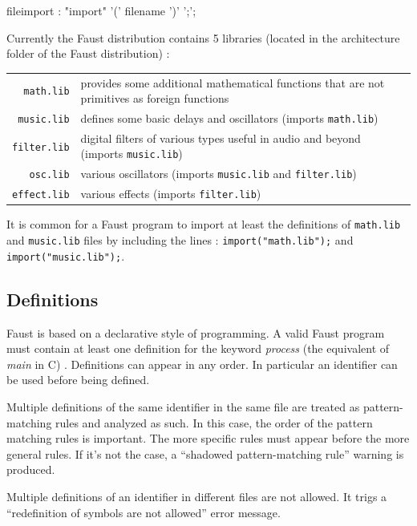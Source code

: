 \documentclass{article}
\begin{document}
\begin{rail}
fileimport : "import" '(' filename ')' ';'; 
\end{rail}

Currently the Faust distribution contains 5 libraries (located in the architecture folder of the Faust distribution) :
  
\begin{tabular}{|r|p{9cm}|} 
\hline
  \lstinline'math.lib'    & provides some additional mathematical functions that are not primitives as foreign functions\\
  \lstinline'music.lib'   & defines some basic delays and oscillators (imports \lstinline'math.lib')\\
  \lstinline'filter.lib'  & digital filters of various types useful in audio and beyond (imports \lstinline'music.lib')\\
  \lstinline'osc.lib'   & various oscillators (imports \lstinline'music.lib' and \lstinline'filter.lib') \\
  \lstinline'effect.lib'   & various effects (imports \lstinline'filter.lib') \\
\hline
\end{tabular}

 
It is common for a Faust program to import at least the definitions of \lstinline'math.lib' and \lstinline'music.lib' files by including the lines : \lstinline{import("math.lib");} and  \lstinline{import("music.lib");}.


\subsection{Definitions}
Faust is based on a declarative style of programming. A valid Faust program must contain at least one definition for the keyword \emph{process}  (the equivalent of \emph{main} in C) . Definitions can appear in any order. In particular an identifier can be used before being defined. 

Multiple definitions of the same identifier in the same file are treated as pattern-matching rules and analyzed as such. In this case, the order of the pattern matching rules is important. The more specific rules must appear before the more general rules. If it's not the case, a ``shadowed pattern-matching rule'' warning is produced.

Multiple definitions of an identifier in different files are not allowed. It trigs a ``redefinition of symbols are not allowed'' error message.
\end{document}

